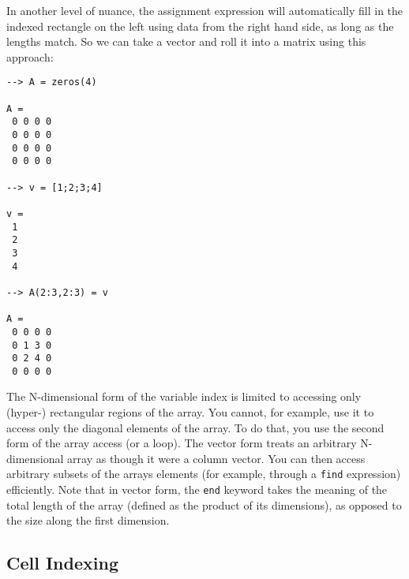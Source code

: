 In another level of nuance, the assignment expression will
automatically fill in the indexed rectangle on the left using
data from the right hand side, as long as the lengths match.
So we can take a vector and roll it into a matrix using this
approach:
\begin{verbatim}
--> A = zeros(4)

A = 
 0 0 0 0 
 0 0 0 0 
 0 0 0 0 
 0 0 0 0 

--> v = [1;2;3;4]

v = 
 1 
 2 
 3 
 4 

--> A(2:3,2:3) = v

A = 
 0 0 0 0 
 0 1 3 0 
 0 2 4 0 
 0 0 0 0 
\end{verbatim}

The N-dimensional form of the variable index is limited
to accessing only (hyper-) rectangular regions of the
array.  You cannot, for example, use it to access only
the diagonal elements of the array.  To do that, you use
the second form of the array access (or a loop).  The
vector form treats an arbitrary N-dimensional array as though
it were a column vector.  You can then access arbitrary
subsets of the arrays elements (for example, through a \verb|find|
expression) efficiently.  Note that in vector form, the \verb|end|
keyword takes the meaning of the total length of the array
(defined as the product of its dimensions), as opposed to the
size along the first dimension.
\subsection{Cell Indexing}

